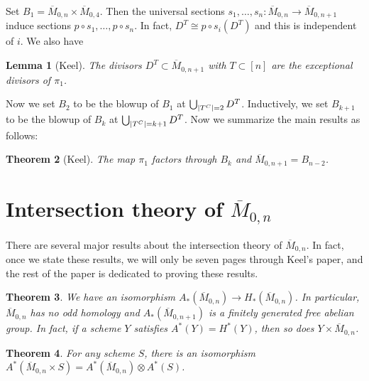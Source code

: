 \documentclass[leqno, openany]{memoir}
\newtheorem{thm}{Theorem}[section]
\newtheorem{lem}[thm]{Lemma}
\theoremstyle{definition}
\theoremstyle{remark}
\theoremstyle{plain}
\theoremstyle{definition}
\theoremstyle{remark}
\newcommand{\ol}[1]{\overline{#1}}
\begin{document}
Set $B_1 = \ol{M}_{0,n} \times \ol{M}_{0,4}$. Then the universal sections $s_1, \ldots, s_n \colon \ol{M}_{0,n} \to \ol{M}_{0,n+1}$ induce sections $p \circ s_1, \ldots, p \circ s_n$. In fact, $D^T \cong p \circ s_i(D^T)$ and this is independent of $i$. We also have

\begin{lem}[Keel]
    The divisors $D^T \subset \ol{M}_{0,n+1}$ with $T \subset [n]$ are the exceptional divisors of $\pi_1$.
\end{lem}

Now we set $B_2$ to be the blowup of $B_1$ at $\bigcup_{\abs{T^C}=2} D^T$. Inductively, we set $B_{k+1}$ to be the blowup of $B_k$ at $\bigcup_{\abs{T^C}=k+1} D^T$. Now we summarize the main results as follows:

\begin{thm}[Keel]
    The map $\pi_1$ factors through $B_k$ and $\ol{M}_{0,n+1} = B_{n-2}$.
\end{thm}

\section{Intersection theory of $\ol{M}_{0,n}$}%
\label{sec:intersection_theory_of_m__0_n_}

There are several major results about the intersection theory of $\ol{M}_{0,n}$. In fact, once we state these results, we will only be seven pages through Keel's paper, and the rest of the paper is dedicated to proving these results.

\begin{thm}
    We have an isomorphism $A_*(\ol{M}_{0,n}) \to H_*(\ol{M}_{0,n})$. In particular, $\ol{M}_{0,n}$ has no odd homology and $A_*(\ol{M}_{0,n+1})$ is a finitely generated free abelian group. In fact, if a scheme $Y$ satisfies $A^*(Y) = H^*(Y)$, then so does $Y \times \ol{M}_{0,n}$.
\end{thm}

\begin{thm}
    For any scheme $S$, there is an isomorphism $A^*(\ol{M}_{0,n} \times S) = A^*(\ol{M}_{0,n}) \otimes A^*(S)$.
\end{thm}
\end{document}

